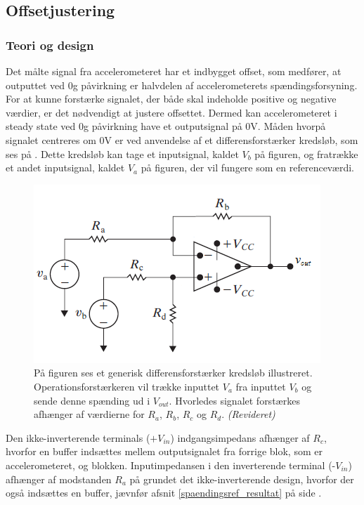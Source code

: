 \subsection{Offsetjustering}
\subsubsection{Teori og design} \label{Offset_Teori_Design}
Det målte signal fra accelerometeret har et indbygget offset, som medfører, at outputtet ved $0$g påvirkning er halvdelen af accelerometerets spændingsforsyning. For at kunne forstærke signalet, der både skal indeholde positive og negative værdier, er det nødvendigt at justere offsettet. Dermed kan accelerometeret i steady state ved $0$g påvirkning have et outputsignal på $0$V. Måden hvorpå signalet centreres om $0$V er ved anvendelse af et differensforstærker kredsløb, som ses på . Dette kredsløb kan tage et inputsignal, kaldet $V_{b}$ på figuren, og fratrække et andet inputsignal, kaldet $V_{a}$ på figuren, der vil fungere som en referenceværdi.
\begin{figure}[H]
\centering
\includegraphics[scale=1.3]{figures/cProblemloesning/Differensforstaerker_generisk1.png}
\caption{På figuren ses et generisk differensforstærker kredsløb illustreret. Operationsforstærkeren vil trække inputtet $V_{a}$ fra inputtet $V_{b}$ og sende denne spænding ud i $V_{out}$. Hvorledes signalet forstærkes afhænger af værdierne for $R_{a}$, $R_{b}$, $R_{c}$ og $R_{d}$. \textit{(Revideret)} \cite{Nilsson2011}}
\label{fig:Differensforstaerker_generisk}
\end{figure}
\noindent Den ikke-inverterende terminals ($+V_{in}$) indgangsimpedans afhænger af $R_{c}$, hvorfor en buffer indsættes mellem outputsignalet fra forrige blok, som er accelerometeret, og blokken. Inputimpedansen i den inverterende terminal (-$V_{in}$) afhænger af modstanden $R_{a}$ på  grundet det ikke-inverterende design, hvorfor der også indsættes en buffer, jævnfør afsnit \ref{spaendingsref_resultat} på side \pageref{spaendingsref_resultat}. \\
